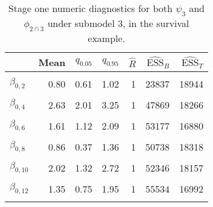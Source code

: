 \begin{table}

\caption{\label{tab:surv-stage-one-submodel-three}Stage one numeric diagnostics for both $\psi_{3}$ and $\phi_{2 \cap 3}$ under submodel 3, in the survival example.}
\centering
\begin{tabular}[t]{lrrrrrr}
\toprule
  & Mean & $q_{0.05}$ & $q_{0.95}$ & $\widehat{R}$ & $\widehat{\text{ESS}}_{B}$ & $\widehat{\text{ESS}}_{T}$\\
\midrule
\cellcolor{gray!6}{$\beta_{0, 1}$} & \cellcolor{gray!6}{1.48} & \cellcolor{gray!6}{1.23} & \cellcolor{gray!6}{1.72} & \cellcolor{gray!6}{1} & \cellcolor{gray!6}{39787} & \cellcolor{gray!6}{21017}\\
$\beta_{0, 2}$ & 0.80 & 0.61 & 1.02 & 1 & 23837 & 18944\\
\cellcolor{gray!6}{$\beta_{0, 3}$} & \cellcolor{gray!6}{1.68} & \cellcolor{gray!6}{0.98} & \cellcolor{gray!6}{2.38} & \cellcolor{gray!6}{1} & \cellcolor{gray!6}{53562} & \cellcolor{gray!6}{16562}\\
$\beta_{0, 4}$ & 2.63 & 2.01 & 3.25 & 1 & 47869 & 18266\\
\cellcolor{gray!6}{$\beta_{0, 5}$} & \cellcolor{gray!6}{0.89} & \cellcolor{gray!6}{0.19} & \cellcolor{gray!6}{1.60} & \cellcolor{gray!6}{1} & \cellcolor{gray!6}{49772} & \cellcolor{gray!6}{18918}\\
$\beta_{0, 6}$ & 1.61 & 1.12 & 2.09 & 1 & 53177 & 16880\\
\cellcolor{gray!6}{$\beta_{0, 7}$} & \cellcolor{gray!6}{0.47} & \cellcolor{gray!6}{-0.23} & \cellcolor{gray!6}{1.18} & \cellcolor{gray!6}{1} & \cellcolor{gray!6}{45219} & \cellcolor{gray!6}{18966}\\
$\beta_{0, 8}$ & 0.86 & 0.37 & 1.36 & 1 & 50738 & 18318\\
\cellcolor{gray!6}{$\beta_{0, 9}$} & \cellcolor{gray!6}{1.47} & \cellcolor{gray!6}{0.88} & \cellcolor{gray!6}{2.07} & \cellcolor{gray!6}{1} & \cellcolor{gray!6}{54848} & \cellcolor{gray!6}{17500}\\
$\beta_{0, 10}$ & 2.02 & 1.32 & 2.72 & 1 & 52346 & 18157\\
\cellcolor{gray!6}{$\beta_{0, 11}$} & \cellcolor{gray!6}{1.77} & \cellcolor{gray!6}{1.16} & \cellcolor{gray!6}{2.37} & \cellcolor{gray!6}{1} & \cellcolor{gray!6}{56243} & \cellcolor{gray!6}{17235}\\
$\beta_{0, 12}$ & 1.35 & 0.75 & 1.95 & 1 & 55534 & 16992\\
\cellcolor{gray!6}{$\beta_{0, 13}$} & \cellcolor{gray!6}{3.27} & \cellcolor{gray!6}{2.69} & \cellcolor{gray!6}{3.84} & \cellcolor{gray!6}{1} & \cellcolor{gray!6}{44453} & \cellcolor{gray!6}{18688}\\

\end{tabular}
\end{table}
